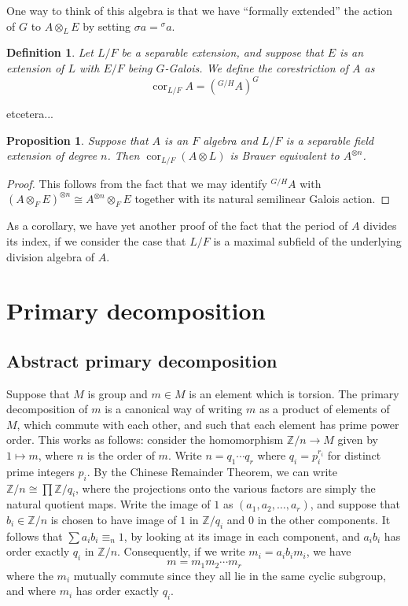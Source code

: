 \documentclass[12pt]{report}
\theoremstyle{plain}
\newtheorem{defn}[thm]{Definition}
\newtheorem{prop}[thm]{Proposition}
\newcommand{\oper}[1]{\operatorname{#1}}
\newcommand{\ZZ}{\mathbb{Z}}
\newcommand{\cores}{\oper{cor}}
\newcommand{\X}[1]{#1\index{#1}}
\newcommand{\todo}[1]{\textcolor{todo}{#1}}
\begin{document}
One way to think of this algebra is that we have ``formally extended'' the
action of $G$ to $A \otimes_L E$ by setting $\sigma a = {}^\sigma a$.

\begin{defn}
Let $L/F$ be a separable extension, and suppose that $E$ is an extension of
$L$ with $E/F$ being $G$-Galois. We define the corestriction of $A$ as
\[\cores_{L/F} A  = ({}^{G/H} A)^G \]
\end{defn}

\todo{etcetera...}

\begin{prop}
Suppose that $A$ is an $F$ algebra and $L/F$ is a separable field extension
of degree $n$. Then $\cores_{L/F}(A \otimes L)$ is Brauer equivalent to
$A^{\otimes n}$.
\end{prop}
\begin{proof}
This follows from the fact that we may identify $^{G/H} A$ with $(A
\otimes_F E)^{\otimes n} \cong A^{\otimes n} \otimes_{F} E$ together with
its natural semilinear Galois action.
\end{proof}

As a corollary, we have yet another proof of the fact that the period of
$A$ divides its index, if we consider the case that $L/F$ is a maximal
subfield of the underlying division algebra of $A$.

\section{Primary decomposition}

\subsection{Abstract primary decomposition}

Suppose that $M$ is group and $m \in M$ is an element which is torsion. The
\X{primary decomposition} of $m$ is a canonical way of writing $m$ as a
product of elements of $M$, which commute with each other, and such that
each element has prime power order. This works as follows: consider the
homomorphism $\mathbb Z/n \to M$ given by $1 \mapsto m$, where $n$ is the
order of $m$. Write $n = q_1 \cdots q_r$
where $q_i = p_i^{r_i}$ for distinct prime integers $p_i$. By the Chinese
Remainder Theorem, we can write $\ZZ/n \cong \prod \ZZ/q_i$, where the
projections onto the various factors are simply the natural quotient maps.
Write the image of $1$ as $(a_1, a_2, \ldots, a_r)$, and suppose
that $b_i \in \ZZ/n$ is chosen to have image of $1$ in $\ZZ/q_i$ and $0$
in the other components. It follows that $\sum a_i b_i \equiv_n 1$, by
looking at its image in each component, and $a_i b_i$ has order exactly
$q_i$ in $\ZZ/n$. Consequently, if we write $m_i = a_i b_i m_i$, we have
\[m = m_1 m_2 \cdots m_r\]
where the $m_i$ mutually commute since they all lie in the same cyclic
subgroup, and where $m_i$ has order exactly $q_i$.
\end{document}
